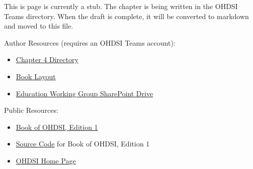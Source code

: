 \documentclass[
  letterpaper,
  paper=7in:10in,
  pagesize=pdftex,
  headinclude=on,
  footinclude=on,
  12pt]{scrbook}
\providecommand{\tightlist}{%
  \setlength{\itemsep}{0pt}\setlength{\parskip}{0pt}}\usepackage{longtable,booktabs,array}
\begin{document}
\begin{tcolorbox}[enhanced jigsaw, opacitybacktitle=0.6, coltitle=black, colback=white, bottomrule=.15mm, bottomtitle=1mm, title=\textcolor{quarto-callout-note-color}{\faInfo}\hspace{0.5em}{Note}, titlerule=0mm, rightrule=.15mm, colbacktitle=quarto-callout-note-color!10!white, colframe=quarto-callout-note-color-frame, toptitle=1mm, arc=.35mm, left=2mm, breakable, opacityback=0, leftrule=.75mm, toprule=.15mm]

This is page is currently a stub. The chapter is being written in the
OHDSI Teams directory. When the draft is complete, it will be converted
to markdown and moved to this file.

Author Resources (requires an OHDSI Teams account):

\begin{itemize}
\tightlist
\item
  \href{https://ohdsiorg.sharepoint.com/sites/Workgroup-EducationWorkingGroup/Shared\%20Documents/Forms/AllItems.aspx?id=\%2Fsites\%2FWorkgroup\%2DEducationWorkingGroup\%2FShared\%20Documents\%2FSection\%20II\%20\%2D\%20Data\%2FChapter\%204\%20\%2D\%20Common\%20Data\%20Model&viewid=05fec2cc\%2Dec8a\%2D4d04\%2Db565\%2Dcf1289b96f67}{Chapter
  4 Directory}
\item
  \href{https://ohdsiorg.sharepoint.com/:x:/r/sites/Workgroup-EducationWorkingGroup/_layouts/15/Doc2.aspx?action=edit&sourcedoc=\%7B1fa31e39-1c5f-4918-b878-609ebd9810b3\%7D&wdOrigin=TEAMS-WEB.teamsSdk_ns.rwc&wdExp=TEAMS-TREATMENT&wdhostclicktime=1748104477731&web=1}{Book
  Layout}
\item
  \href{https://ohdsiorg.sharepoint.com/sites/Workgroup-EducationWorkingGroup/Shared\%20Documents/Forms/AllItems.aspx?viewid=05fec2cc\%2Dec8a\%2D4d04\%2Db565\%2Dcf1289b96f67}{Education
  Working Group SharePoint Drive}
\end{itemize}

Public Resources:

\begin{itemize}
\tightlist
\item
  \href{https://ohdsi.github.io/TheBookOfOhdsi/}{Book of OHDSI, Edition
  1}
\item
  \href{https://github.com/OHDSI/TheBookOfOhdsi}{Source Code} for Book
  of OHDSI, Edition 1
\item
  \href{https://ohdsi.org/}{OHDSI Home Page}
\end{itemize}

\end{tcolorbox}
\end{document}
